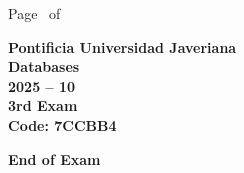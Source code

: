 \documentclass[11pt, addpoints, answers]{exam}\usepackage[utf8]{inputenc}
\begin{document}
\begin{coverpages}
\begin{center}
			\vspace{3mm}
			\leavevmode \hspace{5mm} 
		\end{center}
	\end{coverpages}

	\footer{} {Page \thepage\ of \numpages} {}

	\centering
	\textbf{\Large Pontificia Universidad Javeriana}\\
	\textbf{\Large Databases} \\
	\textbf{\large 2025 -- 10} \\
	\textbf{\large 3rd Exam} \\
	\textbf{Code: 7CCBB4}


	\begin{questions}
		
		
		
		
		
		
		
		
		
		
		
		
		
		
		
		
		
		
		
		
	\end{questions}

	\vspace{5mm}
	\noindent \textbf{End of Exam}
\end{document}
